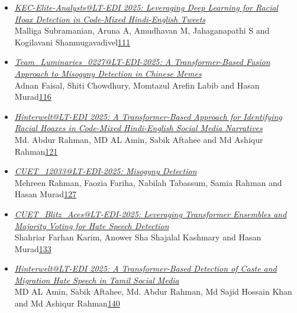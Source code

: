 \documentclass[11pt,oneside]{book}
\begin{document}
\begin{itemize}[leftmargin=*,label={}]
       \item \hyperlink{page.111}{\emph{KEC-Elite-Analysts@LT-EDI 2025: Leveraging Deep Learning for Racial Hoax Detection in Code-Mixed Hindi-English Tweets}}\\ \hspace*{2em} Malliga Subramanian, Aruna A, Amudhavan M, Jahaganapathi S and Kogilavani Shanmugavadivel\dotfill \hyperlink{page.111}{111}
       \item \hyperlink{page.116}{\emph{Team\_Luminaries\_0227@LT-EDI-2025: A Transformer-Based Fusion Approach to Misogyny Detection in Chinese Memes}}\\ \hspace*{2em} Adnan Faisal, Shiti Chowdhury, Momtazul Arefin Labib and Hasan Murad\dotfill \hyperlink{page.116}{116}
       \item \hyperlink{page.121}{\emph{Hinterwelt@LT-EDI 2025: A Transformer-Based Approach for Identifying Racial Hoaxes in Code-Mixed Hindi-English Social Media Narratives}}\\ \hspace*{2em} Md. Abdur Rahman, MD AL Amin, Sabik Aftahee and Md Ashiqur Rahman\dotfill \hyperlink{page.121}{121}
       \item \hyperlink{page.127}{\emph{CUET\_12033@LT-EDI-2025: Misogyny Detection}}\\ \hspace*{2em} Mehreen Rahman, Faozia Fariha, Nabilah Tabassum, Samia Rahman and Hasan Murad\dotfill \hyperlink{page.127}{127}
       \item \hyperlink{page.133}{\emph{CUET\_Blitz\_Aces@LT-EDI-2025: Leveraging Transformer Ensembles and Majority Voting for Hate Speech Detection}}\\ \hspace*{2em} Shahriar Farhan Karim, Anower Sha Shajalal Kashmary and Hasan Murad\dotfill \hyperlink{page.133}{133}
       \item \hyperlink{page.140}{\emph{Hinterwelt@LT-EDI 2025: A Transformer-Based Detection of Caste and Migration Hate Speech in Tamil Social Media}}\\ \hspace*{2em} MD AL Amin, Sabik Aftahee, Md. Abdur Rahman, Md Sajid Hossain Khan and Md Ashiqur Rahman\dotfill \hyperlink{page.140}{140}

\end{itemize}
\end{document}
